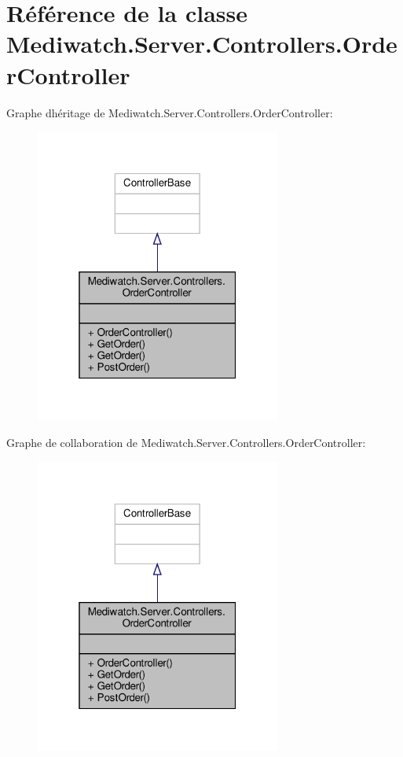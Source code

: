 \hypertarget{class_mediwatch_1_1_server_1_1_controllers_1_1_order_controller}{}\section{Référence de la classe Mediwatch.\+Server.\+Controllers.\+Order\+Controller}
\label{class_mediwatch_1_1_server_1_1_controllers_1_1_order_controller}


Graphe d\textquotesingle{}héritage de Mediwatch.\+Server.\+Controllers.\+Order\+Controller\+:\nopagebreak
\begin{figure}[H]
\begin{center}
\leavevmode
\includegraphics[width=229pt]{class_mediwatch_1_1_server_1_1_controllers_1_1_order_controller__inherit__graph}
\end{center}
\end{figure}


Graphe de collaboration de Mediwatch.\+Server.\+Controllers.\+Order\+Controller\+:\nopagebreak
\begin{figure}[H]
\begin{center}
\leavevmode
\includegraphics[width=229pt]{class_mediwatch_1_1_server_1_1_controllers_1_1_order_controller__coll__graph}
\end{center}
\end{figure}
